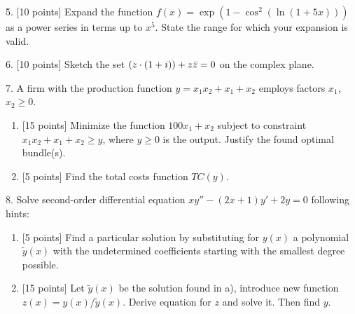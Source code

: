 \documentclass[12pt,a4paper]{article}
\let\Re\relax
\DeclareMathOperator{\Re}{Re}
\begin{document}
\newpage
{}

5. {[10 points]} Expand the function $f(x) = \exp(1 - \cos^2 (\ln(1 + 5x)))$ as a power series in terms up to $x^5$. 
  State the range for which your expansion is valid.

 \newpage 



6. {[10 points]} Sketch the set $\Re(z\cdot (1+i))+z\bar z =0$ on the complex plane.


\newpage
{}

	7. A firm with the production function $y=x_1x_2+x_1+x_2$ employs factors $x_1$, $x_2 \geq 0$.
	  \begin{enumerate}[label=\alph*)]
	    \item {[15 points]} Minimize the function $100x_1+x_2$  subject to constraint  $x_1x_2+x_1+x_2 \geq y$, where  $y\geq 0$ is the output. 
	      Justify the found optimal bundle(s).
	    \item {[5 points]} Find the total costs function  $TC(y)$.
	  \end{enumerate}


	  \newpage
{}
	
	8. Solve second-order differential equation $xy''-(2x+1)y'+2y=0$ following hints: 
	\begin{enumerate}[label=\alph*)]
	    \item {[5 points]} Find a particular solution by substituting for $y(x)$ a polynomial $\tilde y(x)$ with 
	      the undetermined coefficients starting with the smallest degree possible.
	    \item {[15 points]} Let $\tilde y(x)$  be the solution found in a),  introduce new function $z(x)=y(x)/\tilde y(x)$. 
	      Derive equation for $z$ and solve it. Then find $y$.
	  \end{enumerate}
      
\end{document}

